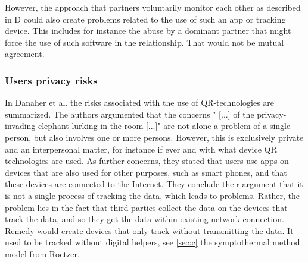 However, the approach that partners voluntarily monitor each other as described in D could also create problems related to the use of such an app or tracking device. This includes for instance the abuse by a dominant partner that might force the use of such software in the relationship. That would not be mutual agreement.

\subsubsection{Users privacy risks}
In Danaher et al. \cite{doi:10.1080/15265161.2017.1422294} the risks associated with the use of \acs{QR}-technologies are summarized.
The authors argumented that the concerns " [...] of the privacy-invading elephant lurking in the room [...]" are not alone a problem of a single person, but also involves one or more persons. However, this is exclusively private and an interpersonal matter, for instance if ever and with what device \acs{QR} technologies are used.
As further concerns, they stated that users use apps on devices that are also used for other purposes, such as smart phones, and that these devices are connected to the Internet. 
They conclude their argument that it is not a single process of tracking the data, which leads to problems. Rather, the problem lies in the fact that third parties collect the data on the devices that track the data, and so they get the data within existing network connection.
Remedy would create devices that only track without transmitting the data.
It used to be tracked without digital helpers, see  \ref{sec:c} the symptothermal method model from Roetzer.
